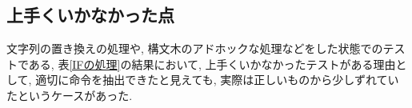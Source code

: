 \documentclass[uplatex,a4j]{jsreport}
\begin{document}



\subsection{上手くいかなかった点}
文字列の置き換えの処理や, 構文木のアドホックな処理などをした状態でのテストである, 
表\ref{IFの処理}の結果において, 上手くいかなかったテストがある理由として, 
適切に命令を抽出できたと見えても, 実際は正しいものから少しずれていたというケースがあった. 
\end{document}
